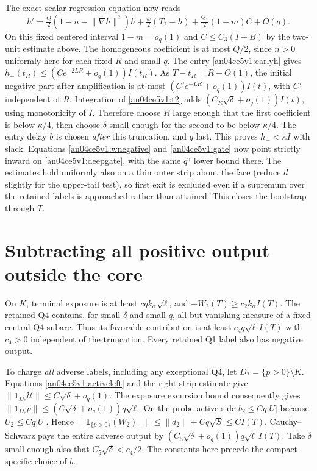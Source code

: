 \documentclass[11pt]{article}
\newcommand{\norm}[1]{\lVert #1\rVert}
\begin{document}
The exact scalar regression equation now reads
\[
 h'=\tfrac Q2(1-n-\norm{\nabla h}^2)h
       +\tfrac w2(T_2-h)+\tfrac{Q_1}2(1-m)C+O(q).
\]
On this fixed centered interval $1-m=o_q(1)$ and $C\le C_3(I+B)$
by the two-unit estimate above. The homogeneous coefficient is at most
$Q/2$, since $n>0$ uniformly here for each fixed $R$ and small $q$.
The entry \eqref{an04ce5v1:earlyh} gives
$h_-(t_R)\le(Ce^{-2LR}+o_q(1)) I(t_R)$. As
$T-t_R=R+O(1)$, the initial negative part after amplification is at
most $(C'e^{-LR}+o_q(1))I(t)$, with $C'$ independent of $R$.
Integration of \eqref{an04ce5v1:t2} adds $(C_R\sqrt\delta+o_q(1))I(t)$,
using monotonicity of $I$. Therefore choose $R$ large enough that
the first coefficient is below $\kappa/4$, then choose $\delta$ small
enough for the second to be below $\kappa/4$. The entry delay $b$ is
chosen \emph{after} this truncation, and $q$ last.
This proves $h_-<\kappa I$ with slack. Equations
\eqref{an04ce5v1:wnegative} and \eqref{an04ce5v1:gate} now point strictly inward on
\eqref{an04ce5v1:deepgate}, with the same $q^\gamma$ lower bound there.
The estimates hold uniformly also on a thin outer strip about the face
(reduce $d$ slightly for the upper-tail test), so first exit is excluded
even if a supremum over the retained labels is approached rather than
attained. This closes the bootstrap through $T$.

\section{Subtracting all positive output outside the core}\label{an04ce5v1:endpoint}
On $K$, terminal exposure is at least $c q k_\alpha\sqrt\ell$, and
$-W_2(T)\ge c_2 k_\alpha I(T)$. The retained Q4 contains, for small
$\delta$ and small $q$, all but vanishing measure of a fixed central
Q4 subarc. Thus its favorable contribution is at least
$c_4 q\sqrt\ell\,I(T)$ with $c_4>0$ independent of the truncation.
Every retained Q1 label also has negative output.

To charge \emph{all} adverse labels, including any exceptional Q4,
let $D_*=\{p>0\}\setminus K$. Equations \eqref{an04ce5v1:activeleft} and
the right-strip estimate give
$\norm{\mathbf1_{D_*}\mathcal U}\le C\sqrt\delta+o_q(1)$.
The exposure excursion bound consequently gives
$\norm{\mathbf1_{D_*}p}\le(C\sqrt\delta+o_q(1))q\sqrt\ell$.
On the probe-active side $b_2\le Cq|U|$ because $U_2\le Cq|U|$.
Hence $\norm{\mathbf1_{\{p>0\}}(W_2)_+}\le\norm{d_2}+Cq\sqrt S
\le C I(T)$. Cauchy--Schwarz pays the entire adverse output by
$(C_5\sqrt\delta+o_q(1))q\sqrt\ell\,I(T)$.
Take $\delta$ small enough also that $C_5\sqrt\delta<c_4/2$.
The constants here precede the compact-specific choice of $b$.
\end{document}
